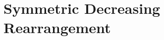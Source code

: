 \documentclass[../main.tex]{subfiles}
\begin{document}
\section{Symmetric Decreasing Rearrangement}
\end{document}
